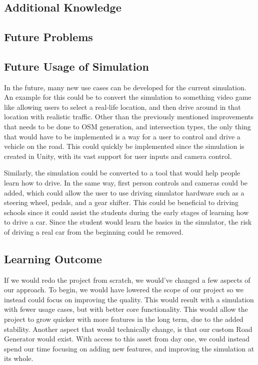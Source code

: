 \section{}
    \subsection{Additional Knowledge}
        

    \subsection{Future Problems}


    \subsection{Future Usage of Simulation}
        In the future, many new use cases can be developed for the current simulation. An example for this could be to convert the simulation to something video game like allowing users to select a real-life location, and then drive around in that location with realistic traffic. Other than the previously mentioned improvements that needs to be done to OSM generation, and intersection types, the only thing that would have to be implemented is a way for a user to control and drive a vehicle on the road. This could quickly be implemented since the simulation is created in Unity, with its vast support for user inputs and camera control. 

        Similarly, the simulation could be converted to a tool that would help people learn how to drive. In the same way, first person controls and cameras could be added, which could allow the user to use driving simulator hardware such as a steering wheel, pedals, and a gear shifter. This could be beneficial to driving schools since it could assist the students during the early stages of learning how to drive a car. Since the student would learn the basics in the simulator, the risk of driving a real car from the beginning could be removed. 

    
    \subsection{Learning Outcome}

        If we would redo the project from scratch, we would've changed a few aspects of our approach. To begin, we would have lowered the scope of our project so we instead could focus on improving the quality. This would result with a simulation with fewer usage cases, but with better core functionality. This would allow the project to grow quicker with more features in the long term, due to the added stability. Another aspect that would technically change, is that our custom Road Generator would exist. With access to this asset from day one, we could instead spend our time focusing on adding new features, and improving the simulation at its whole. 

